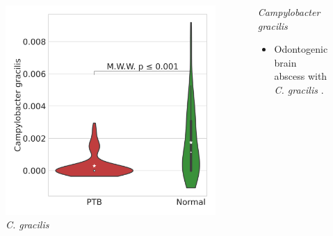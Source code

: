 \documentclass{beamer}
\begin{document}
\begin{frame}[allowframebreaks]
        \begin{columns}
            \begin{column}{0.4 \linewidth}
                \begin{figure}
                    \includegraphics[width=\linewidth]{figures/RandomForest_Proportion/singleton-RF.DADA2.homd.Mouth/Violin_1.pdf}
                    \caption{\textit{C. gracilis}}
                \end{figure}
            \end{column}
            \begin{column}{0.6 \linewidth}
                \begin{block}{\textit{Campylobacter gracilis}}
                    \begin{itemize}
                        \item Odontogenic brain abscess with \textit{C. gracilis} \cite{Campylobacter-1}.
                    \end{itemize}
                \end{block}
            \end{column}
        \end{columns}


\end{frame}
\end{document}
